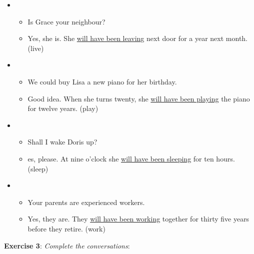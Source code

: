 \begin{itemize}
\item
\begin{itemize}
\item Is Grace your neighbour? 
\item Yes, she is. She \underline{will have been leaving} next door for a year next month. (live)
\end{itemize}

\item
\begin{itemize}
\item We could buy Lisa a new piano for her birthday. 
\item Good idea. When she turns twenty, she \underline{will have been playing} the piano 
for twelve years. (play)
\end{itemize}

\item
\begin{itemize}
\item Shall I wake Doris up? 
\item es, please. At nine o'clock she \underline{will have been sleeping} for ten hours. (sleep)
\end{itemize}
 
\item
\begin{itemize}
\item Your parents are experienced workers.
\item Yes, they are. They \underline{will have been working} together for thirty five years before they retire. (work) 
\end{itemize}

\end{itemize}

\textbf{Exercise 3}: \textit{Complete the conversations}:

